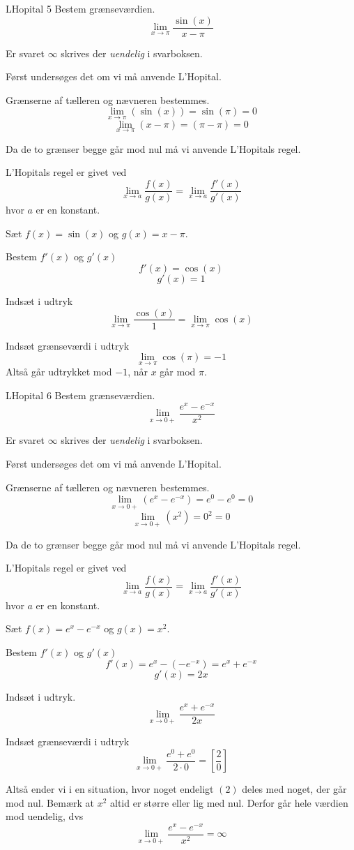 \documentclass{article}
\begin{document}
\begin{exercise}{LHopital 5}
Bestem grænseværdien.
\[
\lim_{x \to \pi} \frac{\sin(x)}{x - \pi}
\] 

Er svaret $\infty$ skrives der \emph{uendelig} i svarboksen.


\hint
Først undersøges det om vi må anvende L'Hopital.

\hint
Grænserne af tælleren og nævneren bestemmes.
\[
\lim_{x \to \pi} (\sin(x)) = \sin(\pi) = 0 
\]
\[
\lim_{x \to \pi} (x - \pi) = (\pi - \pi) = 0
\]

\hint
Da de to grænser begge går mod nul må vi  anvende L'Hopitals regel. 

\hint
L'Hopitals regel er givet ved
\[
\lim_{x \to a} \frac{f(x)}{g(x)} = \lim_{x \to a} \frac{f'(x)}{g'(x)} 
\]
hvor $a$  er en konstant.

\hint
Sæt $f(x) = \sin(x)$ og $g(x) = x - \pi$. 

\hint
Bestem $f'(x)$ og $g'(x)$
\[
	f'(x) = \cos(x)
\]
\[
	g'(x) = 1
\]

\hint
Indsæt i udtryk
\[
\lim_{x \to \pi} \frac{\cos(x)}{1}  = \lim_{x \to \pi} \cos(x)
\]

\hint
Indsæt grænseværdi i udtryk
\[
\lim_{x \to \pi} \cos(\pi) = -1
\]
Altså går udtrykket mod $-1$, når $x$ går mod $\pi$. 

\end{exercise}

\begin{exercise}{LHopital 6}
Bestem grænseværdien.
\[
\lim_{x \to 0+} \frac{e^x - e^{-x}}{x^2}
\] 

Er svaret $\infty$ skrives der \emph{uendelig} i svarboksen.


\hint
Først undersøges det om vi må anvende L'Hopital.

\hint
Grænserne af tælleren og nævneren bestemmes.
\[
\lim_{x \to 0+} (e^x - e^{-x}) = e^0 - e^0 = 0
\]
\[
\lim_{x \to 0+} (x^2)  = 0^2  = 0
\]

\hint
Da de to grænser begge går mod nul må vi  anvende L'Hopitals regel. 

\hint
L'Hopitals regel er givet ved
\[
\lim_{x \to a} \frac{f(x)}{g(x)} = \lim_{x \to a} \frac{f'(x)}{g'(x)} 
\]
hvor $a$  er en konstant.

\hint
Sæt $f(x) = e^x - e^{-x} $ og $g(x) = x^2$. 

\hint
Bestem $f'(x)$ og $g'(x)$
\[
f'(x) = e^x - \left(- e^{-x} \right) = e^x + e^{-x} 
\]
\[
g'(x) = 2x
\]

\hint
Indsæt i udtryk. 
\[
\lim_{x \to 0+} \frac{e^x + e^{-x}}{2x} 
\]

\hint
Indsæt grænseværdi i udtryk
\[
\lim_{x \to 0+} \frac{e^0 + e^0}{2 \cdot 0}  = \left[ \frac{2}{0}  \right] 
\]

\hint 
Altså ender vi i en situation, hvor noget endeligt $(2)$ deles med noget, der går mod nul. Bemærk at $x^2$ altid er større eller lig med nul. Derfor går hele værdien mod uendelig, dvs
\[
\lim_{x \to 0+} \frac{e^x - e^{-x}}{x^2} = \infty
\]

\end{exercise}
\end{document}
